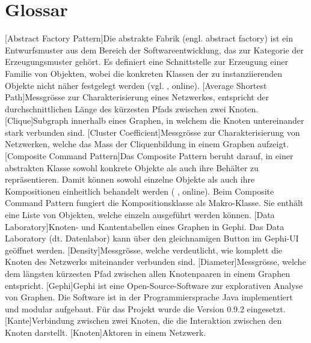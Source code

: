 \chapter*{Glossar}

\begin{acronym}
    [Abstract Factory Pattern]{Die abstrakte Fabrik (engl. abstract factory) ist ein Entwurfsmuster aus dem Bereich der Softwareentwicklung, das zur Kategorie der Erzeugungsmuster gehört. Es definiert eine Schnittstelle zur Erzeugung einer Familie von Objekten, wobei die konkreten Klassen der zu instanziierenden Objekte nicht näher festgelegt werden (vgl. \citeauthor{wikipedia_abstrakte_2018} \citeyear{wikipedia_abstrakte_2018}, online).}
    [Average Shortest Path]{Messgrösse zur Charakterisierung eines Netzwerkes, entspricht der durchschnittlichen Länge des kürzesten Pfads zwischen zwei Knoten.}
    [Clique]{Subgraph innerhalb eines Graphen, in welchem die Knoten untereinander stark verbunden sind.}
    [Cluster Coefficient]{Messgrösse zur Charakterisierung von Netzwerken, welche das Mass der Cliquenbildung in einem Graphen aufzeigt.}
    [Composite Command Pattern]{Das Composite Pattern beruht darauf, in einer abstrakten Klasse sowohl konkrete Objekte als auch ihre Behälter zu repräsentieren. Damit können sowohl einzelne Objekte als auch ihre Kompositionen einheitlich behandelt werden (\citeauthor{wikipedia_kompositum_2019} \citeyear{wikipedia_kompositum_2019}, online). Beim Composite Command Pattern fungiert die Kompositionsklasse als Makro-Klasse. Sie enthält eine Liste von Objekten, welche einzeln ausgeführt werden können.}
    [Data Laboratory]{Knoten- und Kantentabellen eines Graphen in Gephi. Das Data Laboratory (dt. Datenlabor) kann über den gleichnamigen Button im Gephi-UI geöffnet werden.}
    [Density]{Messgrösse, welche verdeutlicht, wie komplett die Knoten des Netzwerks miteinander verbunden sind.}
    [Diameter]{Messgrösse, welche dem längsten kürzesten Pfad zwischen allen Knotenpaaren in einem Graphen entspricht.}
    [Gephi]{Gephi ist eine Open-Source-Software zur explorativen
    Analyse von Graphen. Die Software ist in der Programmiersprache Java implementiert
    und modular aufgebaut. Für das Projekt wurde die Version 0.9.2 eingesetzt.}
    [Kante]{Verbindung zwischen zwei Knoten, die die Interaktion zwischen den Knoten darstellt.}
    [Knoten]{Aktoren in einem Netzwerk.}

\end{acronym}
